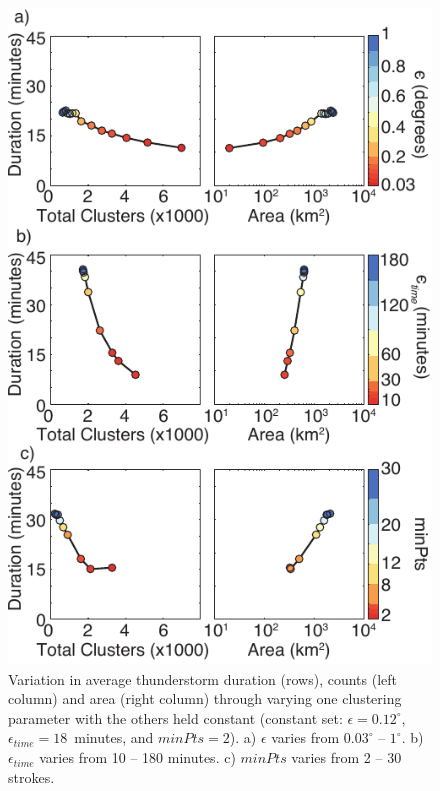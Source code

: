  \begin{figure}[ht!]
    \centering
    \includegraphics[scale=1]{GEC/Figures/parameters.pdf} 
    \caption{Variation in average thunderstorm duration (rows), counts (left column) and area (right column) through varying one clustering parameter with the others held constant (constant set: $\epsilon = 0.12^\circ$, $\epsilon_{time} = 18$~minutes, and $minPts = 2$).
    		 a) $\epsilon$ varies from $0.03^\circ$ -- $1^\circ$.
		 b) $\epsilon_{time}$ varies from 10 -- 180 minutes.
		 c) $minPts$ varies from 2 -- 30 strokes.
		 }
    \label{parameters}
 \end{figure}

